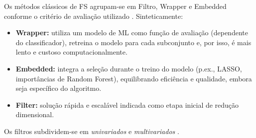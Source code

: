 \bigskip
Os métodos clássicos de FS agrupam-se em Filtro, Wrapper e Embedded conforme o critério de avaliação utilizado \cite{Theng2024}. Sinteticamente:
\begin{itemize}
    \item \textbf{Wrapper:} utiliza um modelo de ML como função de avaliação (dependente do classificador), retreina o modelo para cada subconjunto e, por isso, é mais lento e custoso computacionalmente. \cite{Theng2024}
    \item \textbf{Embedded:} integra a seleção durante o treino do modelo (p.ex., LASSO, importâncias de Random Forest), equilibrando eficiência e qualidade, embora seja específico do algoritmo. \cite{Theng2024, bashir2022novel}
    \item \textbf{Filter:} solução rápida e escalável indicada como etapa inicial de redução dimensional. \cite{bashir2022novel,Theng2024}
\end{itemize}

\bigskip
Os filtros subdividem-se em \emph{univariados} e \emph{multivariados} \cite{Theng2024,SolorioFernandez2020}.

